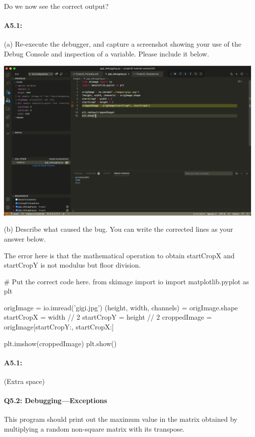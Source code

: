 \documentclass[11pt]{article}
\begin{document}
Do we now see the correct output?

\paragraph{A5.1: } (a) Re-execute the debugger, and capture a screenshot showing your use of the Debug Console and inspection of a variable. Please include it below.

\includegraphics[width=\textwidth]{debug.png}

(b) Describe what caused the bug. You can write the corrected lines as your answer below.

The error here is that the mathematical operation to obtain startCropX and startCropY is not modulus but floor division.
\begin{python}
# Put the correct code here.
from skimage import io
import matplotlib.pyplot as plt

origImage = io.imread('gigi.jpg')
(height, width, channels) = origImage.shape
startCropX = width // 2
startCropY = height // 2
croppedImage = origImage[startCropY:, startCropX:]

plt.imshow(croppedImage)
plt.show()
\end{python}


\pagebreak
\paragraph{A5.1:}
(Extra space)

\pagebreak
\paragraph{Q5.2: Debugging---Exceptions} This program should print out the maximum value in the matrix obtained by multiplying a random non-square matrix with its transpose.
\end{document}
